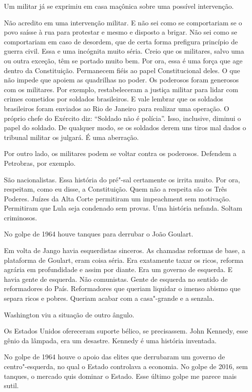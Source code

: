 \falaG Um militar já se exprimiu em casa maçônica sobre uma possível
intervenção.

\falaM Não acredito em uma intervenção militar. E não sei como se
comportariam se o povo saísse à rua para protestar e mesmo e disposto a
brigar. Não sei como se comportariam em caso de desordem, que de certa
forma prefigura princípio de guerra civil. Essa e uma incógnita muito
séria. Creio que os militares, salvo uma ou outra exceção, têm se
portado muito bem. Por ora, essa é uma força que age dentro da
Constituição. Permanecem fiéis ao papel Constitucional deles. O que não
impede que apoiem as quadrilhas no poder. Os poderosos foram generosos
com os militares. Por exemplo, restabeleceram a justiça militar para
lidar com crimes cometidos por soldados brasileiros. E vale lembrar que
os soldados brasileiros foram enviados ao Rio de Janeiro para realizar
uma operação. O próprio chefe do Exército diz: ``Soldado não é
polícia''. Isso, inclusive, diminui o papel do soldado. De qualquer
modo, se os soldados derem uns tiros mal dados o tribunal militar os
julgará. É uma aberração.

\falaG Por outro lado, os militares podem se voltar contra os poderosos.
Defendem a Petrobras, por exemplo.

\falaM São nacionalistas. Essa história do pré"-sal certamente os irrita
muito. Por ora, respeitam, como eu disse, a Constituição. Quem não a
respeita são os Três Poderes. Juízes da Alta Corte permitiram um
impeachment sem motivação. Permitiram que Lula seja condenado sem
provas. Uma história nefanda. Soltam criminosos.

\falaG No golpe de 1964 houve tanques
para derrubar o João Goulart.

\falaM Em volta de Jango havia esquerdistas sinceros. As chamadas reformas
de base, a plataforma de Goulart, eram coisa séria. Era exatamente taxar
os ricos, reforma agrária em profundidade e assim por diante. Era um
governo de esquerda. E havia gente de esquerda. Não comunistas. Gente de
esquerda no sentido de reformadores do País. Reformadores que queriam
liquidar o imenso abismo que separa ricos e pobres. Queriam acabar com a
casa"-grande e a senzala.

\falaG Washington viu a situação de outro ângulo.

\falaM Os Estados Unidos ofereceram suporte bélico, se precisassem. John
Kennedy, esse gênio da lâmpada, era um desastre. Kennedy é uma história
inventada.

\falaG No golpe de 1964 houve o apoio das elites que derrubaram um governo
de centro"-esquerda, no qual o Estado controlava a economia. No golpe de
2016, sem tanques, o mercado quis dominar o Estado. Esse último golpe me
parece mais sutil.

